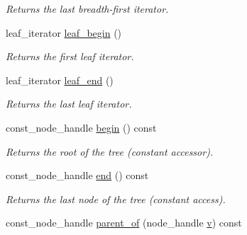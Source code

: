 \begin{DoxyCompactItemize}
\begin{DoxyCompactList}\small\item\em Returns the last breadth-\/first iterator. \end{DoxyCompactList}\item 
\hypertarget{class_d_o_1_1_tree_a3cc80a426bf788cd6c5b94d2084b69cb}{leaf\-\_\-iterator \hyperlink{class_d_o_1_1_tree_a3cc80a426bf788cd6c5b94d2084b69cb}{leaf\-\_\-begin} ()}\label{class_d_o_1_1_tree_a3cc80a426bf788cd6c5b94d2084b69cb}

\begin{DoxyCompactList}\small\item\em Returns the first leaf iterator. \end{DoxyCompactList}\item 
\hypertarget{class_d_o_1_1_tree_ac8e0c3fa6a007feaa01c7c18d314d145}{leaf\-\_\-iterator \hyperlink{class_d_o_1_1_tree_ac8e0c3fa6a007feaa01c7c18d314d145}{leaf\-\_\-end} ()}\label{class_d_o_1_1_tree_ac8e0c3fa6a007feaa01c7c18d314d145}

\begin{DoxyCompactList}\small\item\em Returns the last leaf iterator. \end{DoxyCompactList}\item 
\hypertarget{class_d_o_1_1_tree_af5e8c199fcd6546df1e7b757eb6d2939}{const\-\_\-node\-\_\-handle \hyperlink{class_d_o_1_1_tree_af5e8c199fcd6546df1e7b757eb6d2939}{begin} () const }\label{class_d_o_1_1_tree_af5e8c199fcd6546df1e7b757eb6d2939}

\begin{DoxyCompactList}\small\item\em Returns the root of the tree (constant accessor). \end{DoxyCompactList}\item 
\hypertarget{class_d_o_1_1_tree_a687d5908d94367fd391ce19fd6d48a39}{const\-\_\-node\-\_\-handle \hyperlink{class_d_o_1_1_tree_a687d5908d94367fd391ce19fd6d48a39}{end} () const }\label{class_d_o_1_1_tree_a687d5908d94367fd391ce19fd6d48a39}

\begin{DoxyCompactList}\small\item\em Returns the last node of the tree (constant access). \end{DoxyCompactList}\item 
\hypertarget{class_d_o_1_1_tree_a8f8eaebcfc844da422dd317ce284a3ad}{const\-\_\-node\-\_\-handle \hyperlink{class_d_o_1_1_tree_a8f8eaebcfc844da422dd317ce284a3ad}{parent\-\_\-of} (node\-\_\-handle \hyperlink{group___channel_accessors_ga1dd2524c5b8d3db33137eedb803fc2ce}{v}) const }\label{class_d_o_1_1_tree_a8f8eaebcfc844da422dd317ce284a3ad}


\end{DoxyCompactItemize}
